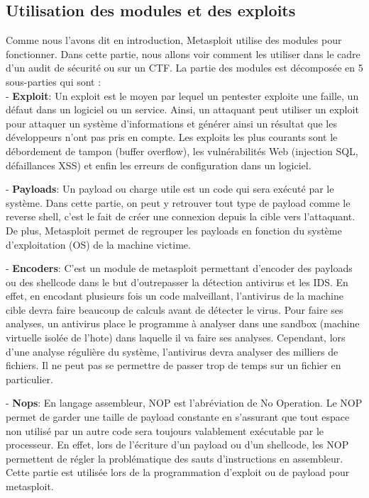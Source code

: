 \subsection{Utilisation des modules et des exploits}

Comme nous l'avons dit en introduction, Metasploit utilise des modules pour fonctionner. Dans cette partie, nous allons voir comment les utiliser dans le cadre d'un audit de sécurité ou sur un CTF. La partie des modules est décomposée en 5 sous-parties qui sont :\\

- \textbf{Exploit}: Un exploit est le moyen par lequel un pentester exploite une faille, un défaut dans un logiciel ou un service. Ainsi, un attaquant peut utiliser un exploit pour attaquer un système d'informations et générer ainsi un résultat que les développeurs n'ont pas pris en compte. Les exploits les plus courants sont le débordement de tampon (buffer overflow), les vulnérabilités Web (injection SQL, défaillances XSS) et enfin les erreurs de configuration dans un logiciel.

- \textbf{Payloads}: Un payload ou charge utile est un code qui sera exécuté par le système. Dans cette partie, on peut y retrouver tout type de payload comme le reverse shell, c'est le fait de créer une connexion depuis la cible vers l’attaquant. De plus, Metasploit permet de regrouper les payloads en fonction du système d'exploitation (OS) de la machine victime.

- \textbf{Encoders}: C'est un module de metasploit permettant d'encoder des payloads ou des shellcode dans le but d'outrepasser la détection antivirus et les IDS. En effet, en encodant plusieurs fois un code malveillant, l'antivirus de la machine cible devra faire beaucoup de calculs avant de détecter le virus. Pour faire ses analyses, un antivirus place le programme à analyser dans une sandbox (machine virtuelle isolée de l'hote) dans laquelle il va faire ses analyses. Cependant, lors d’une analyse régulière du système, l’antivirus devra analyser des milliers de fichiers. Il ne peut pas se permettre de passer trop de temps sur un fichier en particulier.

- \textbf{Nops}: En langage assembleur, NOP est l'abréviation de No Operation. Le NOP permet de garder une taille de payload constante en s'assurant que tout espace non utilisé par un autre code sera toujours valablement exécutable par le processeur. En effet, lors de l'écriture d'un payload ou d'un shellcode, les NOP permettent de régler la problématique des sauts d'instructions en assembleur. Cette partie est utilisée lors de la programmation d'exploit ou de payload pour metasploit.


